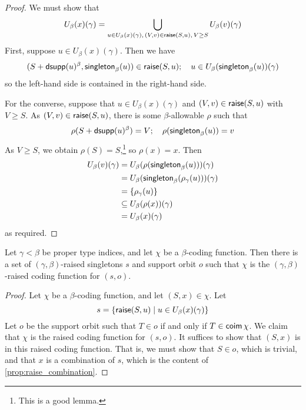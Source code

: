 \begin{proof}
  We must show that
  \[ U_\beta(x)(\gamma) = \bigcup_{u \in U_\beta(x)(\gamma),\,(V,v) \in \operatorname{\mathsf{raise}}(S, u),\, V \geq S} U_\beta(v)(\gamma) \]
  First, suppose \( u \in U_\beta(x)(\gamma) \).
  Then we have
  \[ (S + \operatorname{\mathsf{dsupp}}(u)^\beta, \operatorname{\mathsf{singleton}}_\beta(u)) \in \operatorname{\mathsf{raise}}(S, u);\quad u \in U_\beta(\operatorname{\mathsf{singleton}}_\beta(u))(\gamma) \]
  so the left-hand side is contained in the right-hand side.

  For the converse, suppose that \( u \in U_\beta(x)(\gamma) \) and \( (V, v) \in \operatorname{\mathsf{raise}}(S, u) \) with \( V \geq S \).
  As \( (V, v) \in \operatorname{\mathsf{raise}}(S, u) \), there is some \( \beta \)-allowable \( \rho \) such that
  \[ \rho(S + \operatorname{\mathsf{dsupp}}(u)^\beta) = V;\quad \rho(\operatorname{\mathsf{singleton}}_\beta(u)) = v \]
  As \( V \geq S \), we obtain \( \rho(S) = S \),\footnote{This is a good lemma.} so \( \rho(x) = x \).
  Then
  \begin{align*}
    U_\beta(v)(\gamma)
    &= U_\beta(\rho(\operatorname{\mathsf{singleton}}_\beta(u)))(\gamma) \\
    &= U_\beta(\operatorname{\mathsf{singleton}}_\beta(\rho_\gamma(u)))(\gamma) \\
    &= \{ \rho_\gamma(u) \} \\
    &\subseteq U_\beta(\rho(x))(\gamma) \\
    &= U_\beta(x)(\gamma)
  \end{align*}
  as required.
\end{proof}
\begin{proposition}
  \label{prop:recode}
  Let \( \gamma < \beta \) be proper type indices, and let \( \chi \) be a \( \beta \)-coding function.
  Then there is a set of \( (\gamma,\beta) \)-raised singletons \( s \) and support orbit \( o \) such that \( \chi \) is the \( (\gamma,\beta) \)-raised coding function for \( (s, o) \).
\end{proposition}
\begin{proof}
  Let \( \chi \) be a \( \beta \)-coding function, and let \( (S, x) \in \chi \).
  Let
  \[ s = \{ \operatorname{\mathsf{raise}}(S, u) \mid u \in U_\beta(x)(\gamma) \} \]
  Let \( o \) be the support orbit such that \( T \in o \) if and only if \( T \in \operatorname{\mathsf{coim}} \chi \).
  We claim that \( \chi \) is the raised coding function for \( (s, o) \).
  It suffices to show that \( (S, x) \) is in this raised coding function.
  That is, we must show that \( S \in o \), which is trivial, and that \( x \) is a combination of \( s \), which is the content of \cref{prop:raise_combination}.
\end{proof}

